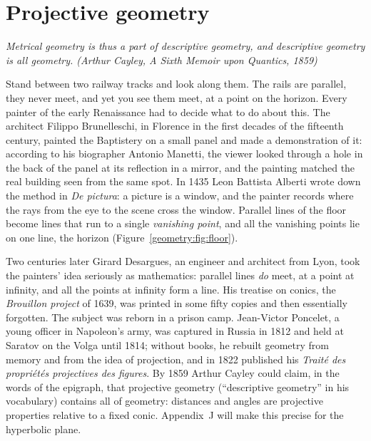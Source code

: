 \chapter{Projective geometry}\label{geometry:ch:projective}

\begin{center}\itshape
Metrical geometry is thus a part of descriptive geometry, and descriptive geometry is all geometry.
\upshape(Arthur Cayley, \emph{A Sixth Memoir upon Quantics}, 1859)
\end{center}

Stand between two railway tracks and look along them. The rails are parallel, they never meet, and yet you see them meet, at a point on
the horizon. Every painter of the early Renaissance had to decide what to do about this. The architect Filippo Brunelleschi, in Florence in
the first decades of the fifteenth century, painted the Baptistery on a small panel and made a demonstration of it: according to his
biographer Antonio Manetti, the viewer looked through a hole in the back of the panel at its reflection in a mirror, and the painting
matched the real building seen from the same spot. In 1435 Leon Battista Alberti wrote down the method in \emph{De pictura}: a picture is a
window, and the painter records where the rays from the eye to the scene cross the window. Parallel lines of the floor become lines that run
to a single \emph{vanishing point}, and all the vanishing points lie on one line, the horizon (Figure~\ref{geometry:fig:floor}).

Two centuries later Girard Desargues, an engineer and architect from Lyon, took the painters' idea seriously as mathematics: parallel lines
\emph{do} meet, at a point at infinity, and all the points at infinity form a line. His treatise on conics, the \emph{Brouillon project} of
1639, was printed in some fifty copies and then essentially forgotten. The subject was reborn in a prison camp. Jean-Victor Poncelet, a young
officer in Napoleon's army, was captured in Russia in 1812 and held at Saratov on the Volga until 1814; without books, he rebuilt geometry
from memory and from the idea of projection, and in 1822 published his \emph{Trait\'e des propri\'et\'es projectives des figures}. By 1859
Arthur Cayley could claim, in the words of the epigraph, that projective geometry (``descriptive geometry'' in his vocabulary) contains all of
geometry: distances and angles are projective properties relative to a fixed conic. Appendix~J will make this precise for the hyperbolic plane.

